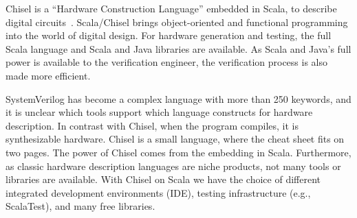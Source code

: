 \documentclass[fleqn,12pt]{article}
\begin{document}
Chisel is a ``Hardware Construction Language'' embedded in Scala, to describe digital circuits~\cite{chisel:dac2012}.
Scala/Chisel brings object-oriented and functional programming into the world of digital design.
For hardware generation and testing, the full Scala language and Scala and Java libraries are available.
As Scala and Java's full power is available to the verification engineer,
the verification process is also made more efficient.


%



SystemVerilog has become a complex language with more than 250 keywords, and it is unclear
which tools support which language constructs for hardware description.
In contrast with Chisel, when the program compiles, it is synthesizable hardware.
Chisel is a small language, where the cheat sheet fits on two pages.
The power of Chisel comes from the embedding in Scala.
Furthermore, as classic hardware description languages are niche products, not
many tools or libraries are available. 
With Chisel on Scala we have the choice of different integrated development environments (IDE),
testing infrastructure (e.g., ScalaTest), and many free libraries.



\end{document}
